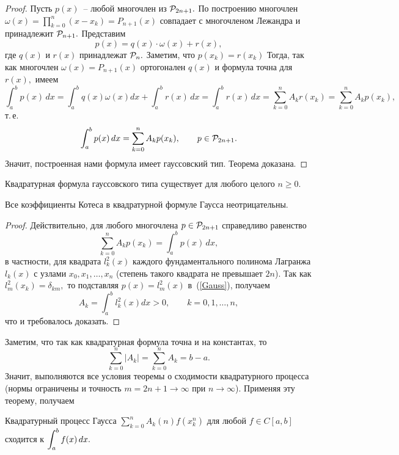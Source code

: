 \begin{proof}
Пусть
$p(x)$~-- любой многочлен из
$\mathcal{P}_{2n+1}.$ {По построению}
многочлен $\omega(x)=\prod\limits_{k=0}^n(x-x_k)=P_{n+1}(x)$
совпадает с
многочленом Лежандра и
принадлежит
$\mathcal{P}_{n+1}.$
Представим
\[
  p(x)=q(x)\cdot \omega(x)+r(x),
\]
где $q(x)$ и $r(x)$ принадлежат $\mathcal{P}_{n}.$ Заметим, что $p(x_k)=r(x_k)$
Тогда, так как многочлен $\omega(x)=P_{n+1}(x)$ ортогонален $q(x)$
и формула точна для $r(x),$ имеем
\[
\int_a^b p(x)\,dx=\int_a^b q(x)\omega(x) dx +\int_a^b r(x)\,dx
               =\int_a^b r(x)\,dx =\sum\limits_{k=0}^n A_k r(x_k)=
                \sum\limits_{k=0}^n A_k p(x_k),
\]
т.\,е.
\[
  \int_a^b p(x)\,dx=
                \sum\limits_{k=0}^n A_k p(x_k),\qquad p \in \mathcal{P}_{2n+1}.
\]
Значит, построенная нами формула {имеет гауссовский тип.} Теорема доказана.
\end{proof}

\begin{Remark}
Квадратурная формула гауссовского типа существует для любого {целого} $n{\ge0}$.
\end{Remark}

\begin{teo}
Все коэффициенты Котеса в квадратурной формуле
Гаусса не\-отрица\-тельны.
\end{teo}

\begin{proof} Действительно, для любого многочлена $p \in \mathcal{P}_{2n+1}$ справедливо равенство
\begin{equation}
\label{Gauss}
  \sum\limits_{k=0}^n A_k p(x_k)=\int_a^b p(x)\,dx,
\end{equation}
в частности, для квадрата $l_k^2(x)$ {каждого}
фундаментального полинома Лагранжа {$l_{k}(x)$
с узлами $x_0,x_1,\ldots,x_n$ (степень такого квадрата не превышает $2n$).} Так как
{$l_m^2(x_k)=\delta_{km},$}
то подставляя {$p(x)=l_m^2(x)$} в~(\ref{Gauss}), получаем
\[
  A_k=\int_a^b l_k^2 (x)dx >0{,\qquad k=0,1,\ldots,n},
\]
что и требовалось доказать.
\end{proof}

Заметим, что так как квадратурная формула точна и на
константах, то
\[
  \sum\limits_{k=0}^n |A_k|=\sum\limits_{k=0}^n A_k=b-a.
\]
Значит, выполняются все условия теоремы о сходимости квадратурного процесса (нормы
ограничены и точность $m=2n+1 \to \infty$ при $n \to \infty$). Применяя эту
теорему, получаем

\begin{Proposition}
{Квадратурный} процесс Гаусса $\sum\limits_{k=0}^n A_k(n) f(x_k^n)$ для любой $f \in
C[a,b]$ сходится к $\displaystyle\int_a^b f(x)\,dx.$
\end{Proposition}

